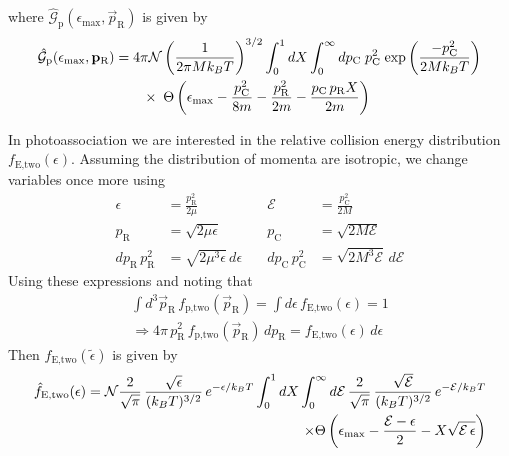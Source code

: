 where $\hat{\mathcal{G}}_\text{p}(\epsilon_\text{max}, \vec{p}_\text{R})$ is given by
\begin{equation} \label{eq:mom_dist_st_3}
\begin{split}
	\hat{\mathcal{G}}_\text{p}(\epsilon_\text{max}, \mathbf{p}_\text{R}) &= 4 \pi \mathcal{N} \left(\frac{1}{2 \pi M k_B T}\right)^{3/2} \int_{0}^1 dX \int_0^{\infty} dp_\text{C} \; p_\text{C}^2 \; \text{exp}\left( {\frac{-p_\text{C}^2}{2 M k_B T}} \right) \\
	 &\quad\quad \times \; \Theta \left( {\epsilon_\text{max} - \frac{p_\text{C}^2}{8m} - \frac{p_\text{R}^2}{2m} - \frac{p_\text{C} \, p_\text{R} X}{2m}} \right)
\end{split}
\end{equation}

In photoassociation we are interested in the relative collision energy distribution $f_\text{E,two}(\epsilon)$.
Assuming the distribution of momenta are isotropic, we change variables once more using
\begin{align*}
	\epsilon &= \frac{p_\text{R}^2}{2 \mu} &\quad \mathcal{E}  &= \frac{p_\text{C}^2}{2 M} \\
	p_\text{R} &= \sqrt{2 \mu \epsilon}    &\quad p_\text{C} &= \sqrt{2 M \mathcal{E}} \\
	dp_\text{R} \, p_\text{R}^2 &= \sqrt{2 \mu^3 \epsilon} \, d\epsilon 	&\quad	dp_\text{C} \, p_\text{C}^2 &= \sqrt{2 M^3 \mathcal{E}} \, d \mathcal{E}
\end{align*}
Using these expressions and noting that 
\begin{equation}
\begin{split}
	\int d^3\vec{p}_\text{R} \, f_\text{p,two}(\vec{p}_\text{R}) = \int d \epsilon \, f_\text{E,two}(\epsilon) = 1 \\
	\Rightarrow 4 \pi \, p_\text{R}^2 \, f_\text{p,two}(\vec{p}_\text{R}) \, dp_\text{R} = f_\text{E,two}(\epsilon) \, d \epsilon
\end{split}
\end{equation}
Then $\hat{f}_\text{E,two}(\tilde{\epsilon})$ is given by
\begin{equation} \label{eq:mom_dist_st_4}
\begin{split}
	\hat{f}_\text{E,two}(\epsilon) = \mathcal{N} \frac{2}{\sqrt{\pi}} \, \frac{\sqrt{\epsilon}}{(k_B T)^{3/2}} \, e^{-\epsilon/k_B T} \int_0^1 dX \int_0^\infty d \mathcal{E} \, \frac{2}{\sqrt{\pi}} \, \frac{\sqrt{\mathcal{E}}}{(k_B T)^{3/2}} \, e^{-\mathcal{E} / k_B T} \\
	\times \Theta \left( {\epsilon_\text{max} - \frac{\mathcal{E} - \epsilon}{2} - X \sqrt{\mathcal{E} \,  \epsilon}} \right)
\end{split}
\end{equation}
